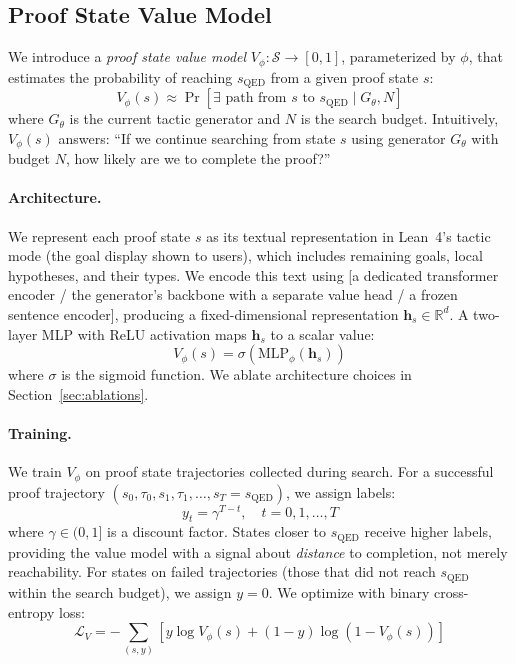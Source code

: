 \documentclass{article}
\begin{document}
\subsection{Proof State Value Model}
\label{sec:value_model}

We introduce a \emph{proof state value model} $V_\phi: \mathcal{S} \rightarrow [0, 1]$, parameterized by $\phi$, that estimates the probability of reaching $s_\text{QED}$ from a given proof state $s$:
\begin{equation}
    V_\phi(s) \approx \Pr[\exists \text{ path from } s \text{ to } s_\text{QED} \mid G_\theta, N]
\end{equation}
where $G_\theta$ is the current tactic generator and $N$ is the search budget. Intuitively, $V_\phi(s)$ answers: ``If we continue searching from state $s$ using generator $G_\theta$ with budget $N$, how likely are we to complete the proof?''

\paragraph{Architecture.} We represent each proof state $s$ as its textual representation in Lean~4's tactic mode (the goal display shown to users), which includes remaining goals, local hypotheses, and their types. We encode this text using [a dedicated transformer encoder / the generator's backbone with a separate value head / a frozen sentence encoder], producing a fixed-dimensional representation $\mathbf{h}_s \in \mathbb{R}^d$. A two-layer MLP with ReLU activation maps $\mathbf{h}_s$ to a scalar value:
\begin{equation}
    V_\phi(s) = \sigma(\text{MLP}_\phi(\mathbf{h}_s))
\end{equation}
where $\sigma$ is the sigmoid function. We ablate architecture choices in Section~\ref{sec:ablations}.

\paragraph{Training.}
We train $V_\phi$ on proof state trajectories collected during search. For a successful proof trajectory $(s_0, \tau_0, s_1, \tau_1, \ldots, s_T = s_\text{QED})$, we assign labels:
\begin{equation}
    y_t = \gamma^{T - t}, \quad t = 0, 1, \ldots, T
\end{equation}
where $\gamma \in (0, 1]$ is a discount factor. States closer to $s_\text{QED}$ receive higher labels, providing the value model with a signal about \emph{distance} to completion, not merely reachability. For states on failed trajectories (those that did not reach $s_\text{QED}$ within the search budget), we assign $y = 0$. We optimize with binary cross-entropy loss:
\begin{equation}
    \mathcal{L}_V = -\sum_{(s, y)} \left[ y \log V_\phi(s) + (1 - y) \log(1 - V_\phi(s)) \right]
\end{equation}
\end{document}
